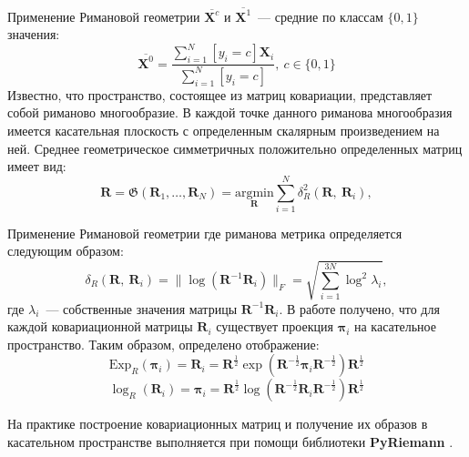 \documentclass[9pt,pdf]{beamer} %
\begin{document}
\begin{frame}{Применение Римановой геометрии}
$\overline{\bm{X}^c}$ и $\overline{\bm{X}^1}$~--- средние по классам $\{0,1\}$ значения:
$$\overline{\bm{X}^0} = \dfrac{\sum_{i = 1}^N\left[y_i = c\right] \bm{X}_i}{\sum_{i = 1}^N\left[y_i = c\right]},~c\in\{0,1\}$$
Известно, что пространство, состоящее из матриц ковариации, представляет собой 
риманово многообразие\cite{barachant2010riemannian}. 
В каждой точке данного риманова многообразия имеется касательная плоскость с 
определенным скалярным произведением на ней. Среднее геометрическое симметричных положительно определенных матриц имеет вид:
$$\bm{R} = \mathfrak{G}\left(\bm{R}_1,\dots,\bm{R}_N\right) = \underset{\bm{R}}{\text{argmin}}\sum_{i = 1}^N
\delta^2_R(\bm{R},~\bm{R}_i),$$

\end{frame}
\begin{frame}{Применение Римановой геометрии}
где риманова метрика определяется следующим образом:
$$\delta_R(\bm{R},~\bm{R}_i) = \|\log (\bm{R}^{-1}\bm{R}_i)\|_F = \sqrt{\sum_{i = 1}^{3N} \log^2\lambda_i},$$
где $\lambda_i$~--- собственные значения матрицы $\bm{R}^{-1}\bm{R}_i$. В работе \cite{barachant2010riemannian}
получено, что для каждой ковариационной матрицы $\bm{R}_i$ существует проекция $\bm{\pi}_i$ на касательное пространство.
Таким образом, определено отображение:
$$\text{Exp}_{R}(\bm{\pi}_i) = \bm{R}_i = \bm{R}^{\frac{1}{2}} \exp\left(\bm{R}^{-\frac{1}{2}}\bm{\pi}_i\bm{R}^{-\frac{1}{2}}\right) \bm{R}^{\frac{1}{2}}$$
$$\log_{R}(\bm{R}_i) = \bm{\pi}_i = \bm{R}^{\frac{1}{2}} \log\left(\bm{R}^{-\frac{1}{2}}\bm{R}_i\bm{R}^{-\frac{1}{2}}\right) \bm{R}^{\frac{1}{2}}$$

На практике построение ковариационных матриц и получение их образов в касательном пространстве выполняется 
при помощи библиотеки \textbf{PyRiemann} \cite{congedo2013new}.

\end{frame}
\end{document}
